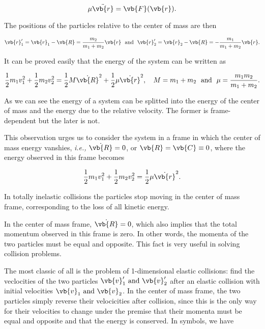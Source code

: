 \documentclass[a4paper,12pt]{report}
\begin{document}
\begin{equation}
	\mu \ddot{\vb{r} } = \vb{F} (\vb{r} ). 
\end{equation}

The positions of the particles relative to the center of mass are then 

\begin{equation}
	\vb{r} _{1}' = \vb{r} _{1} - \vb{R} = \frac{m_2 }{m_1 +m_2 }\vb{r} ~\text { and }~ \vb{r} _{2}' = \vb{r} _{2} - \vb{R} = -\frac{m_1 }{m_1 +m_2 } \vb{r}  .
\end{equation}

It can be proved easily that the energy of the system can be written as 

\begin{equation}
	\frac{1}{2}m_1v_1 ^2 + \frac{1}{2}m_2 v_2 ^2 = \frac{1}{2} M \dot{\vb{R} } ^2 + \frac{1}{2} \mu \dot{\vb{r} }^2, \quad M = m_1 +m_2 ~\text { and }~ \mu = \frac{m_1 m_2 }{m_1 +m_2 }.     
\end{equation}

As we can see the energy of a system can be splitted into the energy of the center of mass and the energy due to the relative velocity. The former is frame-dependent but the later is not. 

This observation urges us to consider the system in a frame in which the center of mass energy vanshies, \textit{i.e.,} \(\dot{\vb{R} } = 0\), or \(\vb{R} = \vb{C} \equiv 0\), where the energy observed in this frame becomes

\begin{equation}
	\frac{1}{2} m_1 v_1 ^2+ \frac{1}{2} m_2 v_2 ^2 = \frac{1}{2} \mu \dot{\vb{r} }^2.  
\end{equation}

In totally inelastic collisions the particles stop moving in the center of mass frame, corresponding to the loss of all kinetic energy.




In the center of mass frame, \(\dot{\vb{R} } = 0\), which also implies that the total momentum observed in this frame is zero. In other words, the momenta of the two particles must be equal and opposite. This fact is very useful in solving collision problems.

The most classic of all is the problem of 1-dimensional elastic collisions: find the veclocities of the two particles \(\vb{v} _{1}' \text { and } \vb{v} _{2}'  \)  after an elastic collision with initial velocities \(\vb{v} _{1} \text { and } \vb{v} _{2}  \). In the center of mass frame, the two particles simply reverse their velocicities after collision, since this is the only way for their velocities to change under the premise that their momenta must be equal and opposite and that the energy is conserved. In symbols, we have 
\end{document}
